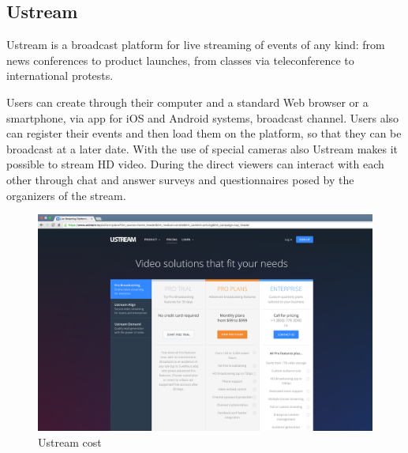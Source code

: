 \subsection{Ustream}
\label{sec:Ustream}
 Ustream is a broadcast platform for live streaming of events of any kind: from news conferences to product launches, from classes via teleconference to international protests.

Users can create through their computer and a standard Web browser or a smartphone, via app for iOS and Android systems, broadcast channel.
Users also can register their events and then load them on the platform, so that they can be broadcast at a later date. With the use of special cameras also Ustream makes it possible to stream HD video.
During the direct viewers can interact with each other through chat and answer surveys and questionnaires posed by the organizers of the stream.

  
 \begin{figure}[!htb]
 \centering
 \includegraphics[width=1.0\linewidth]{images/chapter2/ustream.png}\hfill
 \caption[Ustream cost]{Ustream cost}
 \label{fig:fourV}
\end{figure}